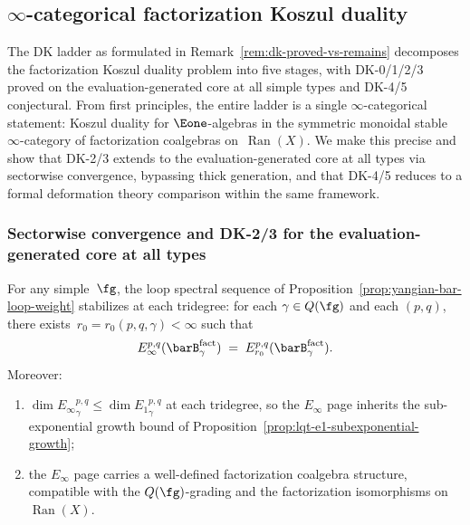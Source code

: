 \subsection{$\infty$-categorical factorization Koszul duality}
\label{sec:infty-cat-factorization-kd}

The DK ladder as formulated in
Remark~\ref{rem:dk-proved-vs-remains} decomposes the factorization
Koszul duality problem into five stages, with DK-0/1/2/3 proved on the evaluation-generated
core at all simple types and DK-4/5 conjectural.  From first principles, the
entire ladder is a single $\infty$-categorical statement: Koszul
duality for $\Eone$-algebras in the symmetric monoidal stable
$\infty$-category of factorization coalgebras on~$\operatorname{Ran}(X)$.
We make this precise and show that DK-2/3 extends to the
evaluation-generated core at all types via
sectorwise convergence, bypassing thick generation, and that DK-4/5
reduces to a formal deformation theory comparison within the same
framework.

\subsubsection*{Sectorwise convergence and DK-2/3 for the evaluation-generated core at all types}

\begin{theorem}
\label{thm:sectorwise-spectral-convergence}
For any simple~$\fg$, the loop spectral sequence of
Proposition~\ref{prop:yangian-bar-loop-weight} stabilizes at each
tridegree: for each $\gamma \in Q(\fg)$ and each $(p,q)$, there
exists~$r_0 = r_0(p,q,\gamma) < \infty$ such that
\[
E_\infty^{p,q}(\barB_\gamma^{\mathrm{fact}})
\;=\; E_{r_0}^{p,q}(\barB_\gamma^{\mathrm{fact}}).
\]
Moreover:
\begin{enumerate}[label=\textup{(\alph*)}]
\item $\dim {E_\infty}^{p,q}_\gamma \le \dim {E_1}^{p,q}_\gamma$ at each
  tridegree, so the $E_\infty$ page inherits the sub-exponential
  growth bound of
  Proposition~\ref{prop:lqt-e1-subexponential-growth};
\item the $E_\infty$ page carries a well-defined factorization
  coalgebra structure, compatible with the $Q(\fg)$-grading
  and the factorization isomorphisms on
  $\operatorname{Ran}(X)$.
\end{enumerate}
\end{theorem}

